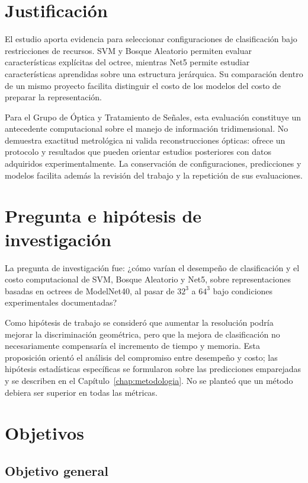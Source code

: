 \section{Justificación}
\label{sec:justificacion}
El estudio aporta evidencia para seleccionar configuraciones de clasificación bajo restricciones de recursos. SVM y Bosque Aleatorio permiten evaluar características explícitas del octree, mientras Net5 permite estudiar características aprendidas sobre una estructura jerárquica. Su comparación dentro de un mismo proyecto facilita distinguir el costo de los modelos del costo de preparar la representación.

Para el Grupo de Óptica y Tratamiento de Señales, esta evaluación constituye un antecedente computacional sobre el manejo de información tridimensional. No demuestra exactitud metrológica ni valida reconstrucciones ópticas: ofrece un protocolo y resultados que pueden orientar estudios posteriores con datos adquiridos experimentalmente. La conservación de configuraciones, predicciones y modelos facilita además la revisión del trabajo y la repetición de sus evaluaciones.

\section{Pregunta e hipótesis de investigación}
\label{sec:pregunta-hipotesis}
La pregunta de investigación fue: ¿cómo varían el desempeño de clasificación y el costo computacional de SVM, Bosque Aleatorio y Net5, sobre representaciones basadas en octrees de ModelNet40, al pasar de $32^3$ a $64^3$ bajo condiciones experimentales documentadas?

Como hipótesis de trabajo se consideró que aumentar la resolución podría mejorar la discriminación geométrica, pero que la mejora de clasificación no necesariamente compensaría el incremento de tiempo y memoria. Esta proposición orientó el análisis del compromiso entre desempeño y costo; las hipótesis estadísticas específicas se formularon sobre las predicciones emparejadas y se describen en el Capítulo~\ref{chap:metodologia}. No se planteó que un método debiera ser superior en todas las métricas.

\section{Objetivos}
\label{sec:objetivos}

\subsection{Objetivo general}

